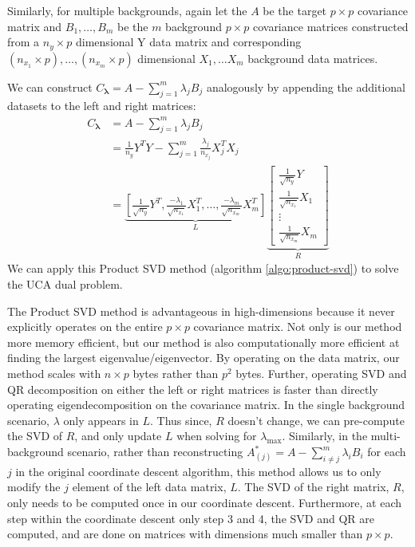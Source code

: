 \documentclass[nocrop]{bioinfo}
\begin{document}
\begin{methods}
Similarly, for multiple backgrounds, again let the $A$ be the target $p \times p$ covariance matrix and $ B_1, \ldots, B_m$ be the $m$ background $p \times p$ covariance matrices constructed from a $n_y \times p$ dimensional Y data matrix and corresponding $(n_{x_1} \times p), \ldots, (n_{x_m}\times p)$ dimensional $X_1, \ldots X_m$ background data matrices.

We can construct $C_{\boldsymbol{\lambda}} = A - \sum^{m}_{j=1}\lambda_jB_j$ analogously by appending the additional datasets to the left and right matrices:
\begin{align}
    C_{\boldsymbol{\lambda}}&= A - \sum^{m}_{j=1}\lambda_jB_j \nonumber \\
                                  &=\frac{1}{n_y}Y^{T}Y -\sum_{j=1}^{m}{\frac{\lambda_{j}}{n_{x_j}}X_{j}^TX_{j}} \nonumber\\
                                  &=  \underbrace{\left[\frac{1}{\sqrt{n_y}}Y^T, \frac{-\lambda_1}{\sqrt{n_{x_{1}}}} X^T_1, \ldots, \frac{-\lambda_m}{\sqrt{n_{x_{m}}}}X^T_m\right]}_{L} \underbrace{\begin{bmatrix} \frac{1}{\sqrt{n_{y}}}Y \\ \frac{1}{\sqrt{n_{x_{1}}}}X_1 \\ \vdots \\ \frac{1}{\sqrt{n_{x_{m}}}}X_m \end{bmatrix}}_{R} \label{eq:8}
\end{align}
We can apply this Product SVD method (algorithm \ref{algo:product-svd}) to solve the UCA dual problem.

The Product SVD method is advantageous in high-dimensions because it never explicitly operates on the entire $p \times p$ covariance matrix. 
Not only is our method more memory efficient, but our method is also computationally more efficient at finding the largest eigenvalue/eigenvector. By operating on the data matrix, our method scales with $n\times p$ bytes rather than $p^2$ bytes. Further, operating SVD and QR decomposition on either the left or right matrices is faster than directly operating eigendecomposition on the covariance matrix. In the single background scenario,  $\lambda$ only appears in $L$. Thus since, $R$ doesn't change, we can pre-compute the SVD of $R$, and only update $L$ when solving for $\lambda_{\text{max}}$.
Similarly, in the multi-background scenario, rather than reconstructing $A^{*}_{(j)} = A-\sum^{m}_{i\neq j}\lambda_i B_i$ for each $j$ in the original coordinate descent algorithm, this method allows us to only modify the $j$ element of the left data matrix, $L$.
The SVD of the right matrix, $R$, only needs to be computed once in our coordinate descent. Furthermore, at each step within the coordinate descent only step 3 and 4, the SVD and QR are computed, and are done on matrices with dimensions much smaller than $p \times p$.


\end{methods}
\end{document}
